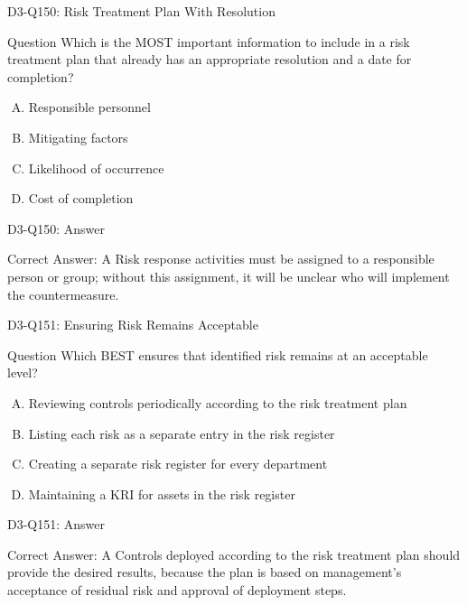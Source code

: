 \documentclass{beamer}
\begin{document}
	\begin{frame}{D3-Q150: Risk Treatment Plan With Resolution}
		\begin{block}{Question}
			Which is the MOST important information to include in a risk treatment plan that already has an appropriate resolution and a date for completion?
		\end{block}
		\begin{enumerate}[(A)]
			\item Responsible personnel
			\item Mitigating factors
			\item Likelihood of occurrence
			\item Cost of completion
		\end{enumerate}
	\end{frame}
	\begin{frame}{D3-Q150: Answer}
		\begin{block}{Correct Answer: A}
			Risk response activities must be assigned to a responsible person or group; without this assignment, it will be unclear who will implement the countermeasure.
		\end{block}
	\end{frame}
	
	\begin{frame}{D3-Q151: Ensuring Risk Remains Acceptable}
		\begin{block}{Question}
			Which BEST ensures that identified risk remains at an acceptable level?
		\end{block}
		\begin{enumerate}[(A)]
			\item Reviewing controls periodically according to the risk treatment plan
			\item Listing each risk as a separate entry in the risk register
			\item Creating a separate risk register for every department
			\item Maintaining a KRI for assets in the risk register
		\end{enumerate}
	\end{frame}
	\begin{frame}{D3-Q151: Answer}
		\begin{block}{Correct Answer: A}
			Controls deployed according to the risk treatment plan should provide the desired results, because the plan is based on management's acceptance of residual risk and approval of deployment steps.
		\end{block}
	\end{frame}
	
\end{document}
